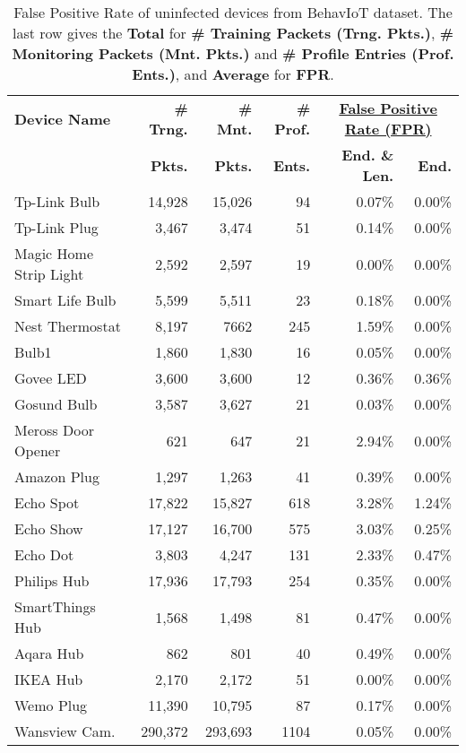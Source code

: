 \begin{table}[t!]
\scriptsize
\centering
\caption{False Positive Rate of uninfected devices from BehavIoT dataset. The last row gives the \textbf{Total} for \textbf{\# Training Packets (Trng. Pkts.)}, \textbf{\# Monitoring Packets (Mnt. Pkts.)} and \textbf{\# Profile Entries (Prof. Ents.)}, and \textbf{Average} for \textbf{FPR}.}
\begin{tabularx}{\linewidth}{p{15mm} r r r r r}
  \toprule
  \textbf{Device Name} & \textbf{\# Trng.} &\textbf{\# Mnt.} & \textbf{\# Prof.} & \multicolumn{2}{c}{\textbf{\underline{False Positive Rate (FPR)}}} \\
  & \textbf{Pkts.} & \textbf{Pkts.} & \textbf{Ents.} & \textbf{End. \& Len.} & \textbf{End.}\\
  \midrule
 Tp-Link Bulb & 14,928 & 15,026 & 94 & 0.07\% & 0.00\% \\ 
Tp-Link Plug & 3,467 & 3,474 & 51 & 0.14\% & 0.00\% \\ 
Magic Home Strip Light & 2,592 & 2,597 & 19 & 0.00\% & 0.00\% \\ 
Smart Life Bulb & 5,599 & 5,511 & 23 & 0.18\% & 0.00\% \\ 
Nest Thermostat & 8,197 & 7662 & 245 & 1.59\% & 0.00\% \\ 
Bulb1 & 1,860 & 1,830 & 16 & 0.05\% & 0.00\% \\ 
Govee LED & 3,600 & 3,600 & 12 & 0.36\% & 0.36\%  \\ 
Gosund Bulb & 3,587 & 3,627 & 21 & 0.03\% & 0.00\% \\ 
Meross Door Opener & 621 & 647 & 21 & 2.94\% & 0.00\% \\ 
Amazon Plug & 1,297 & 1,263 & 41 & 0.39\% & 0.00\% \\ 
Echo Spot & 17,822 & 15,827 & 618 & 3.28\% & 1.24\% \\ 
Echo Show & 17,127 & 16,700 & 575 & 3.03\% & 0.25\% \\ 
Echo Dot & 3,803 & 4,247 & 131 & 2.33\% & 0.47\% \\ 
Philips Hub & 17,936 & 17,793 & 254 & 0.35\% & 0.00\%\\ 
SmartThings Hub & 1,568 & 1,498 & 81 & 0.47\% & 0.00\%\\ 
Aqara Hub & 862 & 801 & 40 & 0.49\% & 0.00\% \\ 
IKEA Hub & 2,170 & 2,172 & 51 & 0.00\% & 0.00\% \\
Wemo Plug & 11,390 & 10,795 & 87 & 0.17\% & 0.00\% \\ 
Wansview Cam. & 290,372 & 293,693 & 1104 & 0.05\% & 0.00\% \\ 

\end{tabularx}
\end{table}
